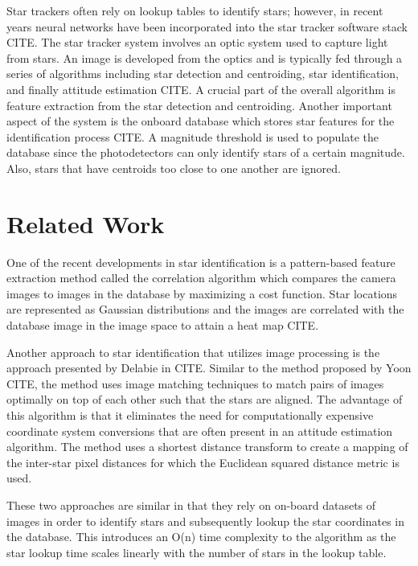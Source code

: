 \documentclass[10pt,twocolumn,letterpaper]{article}
\begin{document}
Star trackers often rely on lookup tables to identify stars; however, in recent years neural networks have been incorporated into the star tracker software stack CITE. The star tracker system involves an optic system used to capture light from stars. An image is developed from the optics and is typically fed through a series of algorithms including star detection and centroiding, star identification, and finally attitude estimation CITE. A crucial part of the overall algorithm is feature extraction from the star detection and centroiding. Another important aspect of the system is the onboard database which stores star features for the identification process CITE. A magnitude threshold is used to populate the database since the photodetectors can only identify stars of a certain magnitude. Also, stars that have centroids too close to one another are ignored.


\section{Related Work}
\label{sec:related}

One of the recent developments in star identification is a pattern-based feature extraction method called the correlation algorithm which compares the camera images to images in the database by maximizing a cost function. Star locations are represented as Gaussian distributions and the images are correlated with the database image in the image space to attain a heat map CITE.

Another approach to star identification that utilizes image processing is the approach presented by Delabie \etal in CITE. Similar to the method proposed by Yoon \etal CITE, the method uses image matching techniques to match pairs of images optimally on top of each other such that the stars are aligned. The advantage of this algorithm is that it eliminates the need for computationally expensive coordinate system conversions that are often present in an attitude estimation algorithm. The method uses a shortest distance transform to create a mapping of the inter-star pixel distances for which the Euclidean squared distance metric is used.

These two approaches are similar in that they rely on on-board datasets of images in order to identify stars and subsequently lookup the star coordinates in the database. This introduces an O(n) time complexity to the algorithm as the star lookup time scales linearly with the number of stars in the lookup table.
\end{document}
